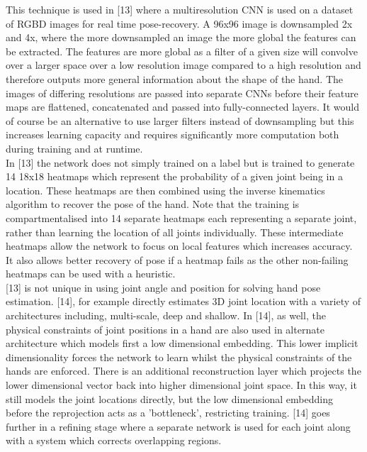 \documentclass{article}
\begin{document}
This technique is used in [13] where a multiresolution CNN is used on a dataset of RGBD images for real time pose-recovery. A 96x96 image is downsampled 2x and 4x, where the more downsampled an image the more global the features can be extracted. The features are more global as a filter of a given size will convolve over a larger space over a low resolution image compared to a high resolution and therefore outputs more general information about the shape of the hand. The images of differing resolutions are passed into separate CNNs before their feature maps are flattened, concatenated and passed into fully-connected layers. It would of course be an alternative to use larger filters instead of downsampling but this increases learning capacity and requires significantly more computation both during training and at runtime.\\

In [13] the network does not simply trained on a label but is trained to generate 14 18x18 heatmaps which represent the probability of a given joint being in a location. These heatmaps are then combined using the inverse kinematics algorithm to recover the pose of the hand. Note that the training is compartmentalised into 14 separate heatmaps each representing a separate joint, rather than learning the location of all joints individually. These intermediate heatmaps allow the network to focus on local features which increases accuracy. It also allows better recovery of pose if a heatmap fails as the other non-failing heatmaps can be used with a heuristic.\\

[13] is not unique in using joint angle and position for solving hand pose estimation. [14], for example directly estimates 3D joint location with a variety of architectures including, multi-scale, deep and shallow. In [14], as well, the physical constraints of joint positions in a hand are also used in alternate architecture which models first a low dimensional embedding. This lower implicit dimensionality forces the network to learn whilst the physical constraints of the hands are enforced. There is an additional reconstruction layer which projects the lower dimensional vector back into higher dimensional joint space. In this way, it still models the joint locations directly, but the low dimensional embedding before the reprojection acts as a 'bottleneck', restricting training. [14] goes further in a refining stage where a separate network is used for each joint along with a system which corrects overlapping regions.\\
\end{document}
